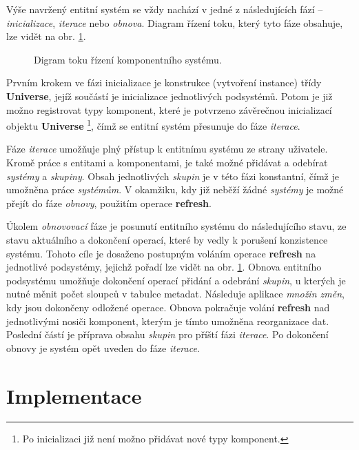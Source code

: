 Výše navržený entitní systém se vždy nachází v jedné z následujících fází -- \emph{inicializace}, \emph{iterace} nebo \emph{obnova}. Diagram řízení toku, který tyto fáze obsahuje, lze vidět na obr. \ref{Fig:DESFlow}.

\begin{figure}[H]
	\begin{center}
	\end{center}
	\caption{Digram toku řízení komponentního systému.}
	\label{Fig:DESFlow}
\end{figure}

Prvním krokem ve fázi inicializace je konstrukce (vytvoření instance) třídy \textbf{Universe}, jejíž součástí je inicializace jednotlivých podsystémů. Potom je již možno registrovat typy komponent, které je potvrzeno závěrečnou inicializací objektu \textbf{Universe} \footnote{Po inicializaci již není možno přidávat nové typy komponent.}, čímž se entitní systém přesunuje do fáze \emph{iterace}. 

Fáze \emph{iterace} umožňuje plný přístup k entitnímu systému ze strany uživatele. Kromě práce s entitami a komponentami, je také možné přidávat a odebírat \emph{systémy} a \emph{skupiny}. Obsah jednotlivých \emph{skupin} je v této fázi konstantní, čímž je umožněna práce \emph{systémům}. V okamžiku, kdy již neběží žádné \emph{systémy} je možné přejít do fáze \emph{obnovy}, použitím operace \textbf{refresh}.

Úkolem \emph{obnovovací} fáze je posunutí entitního systému do následujícího stavu, ze stavu aktuálního a dokončení operací, které by vedly k porušení konzistence systému. Tohoto cíle je dosaženo postupným voláním operace \textbf{refresh} na jednotlivé podsystémy, jejichž pořadí lze vidět na obr. \ref{Fig:DESFlow}. Obnova entitního podsystému umožňuje dokončení operací přidání a odebrání \emph{skupin}, u kterých je nutné měnit počet sloupců v tabulce metadat. Následuje aplikace \emph{množin změn}, kdy jsou dokončeny odložené operace. Obnova pokračuje volání \textbf{refresh} nad jednotlivými nosiči komponent, kterým je tímto umožněna reorganizace dat. Poslední částí je příprava obsahu \emph{skupin} pro příští fázi \emph{iterace}. Po dokončení obnovy je systém opět uveden do fáze \emph{iterace}.

\chapter{Implementace}
\blind[2]

